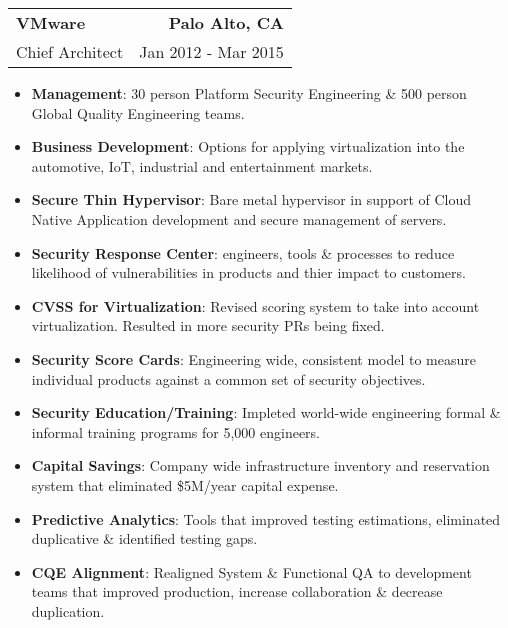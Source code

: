\documentclass[letterpaper,11pt]{article}
\makeatletter
\newcommand{\resumeSubheading}[4]{
  \vspace{-1pt}
    \item
    \begin{tabular*}{1.0\textwidth}[t]{l@{\extracolsep{\fill}}r}
      \textbf{\Large#1} & \textbf{#2} \\
      {\large #3} & {\large #4}
    \end{tabular*}\vspace{-5pt}
  }
\newcommand{\resumeItem}[2]{\item{{\textbf{\small#1}}: {\small#2 \vspace{-1pt}}}}
\newcommand{\resumeItemListStart}{\begin{itemize}}
\newcommand{\resumeItemListEnd}{\end{itemize}}\vspace{-10pt}
\makeatother
\begin{document}
        \resumeSubheading
            {VMware}
            {Palo Alto, CA}
            {Chief Architect}
            {Jan 2012 - Mar 2015}
            \resumeItemListStart
                \resumeItem{Management}{30 person Platform Security Engineering \& 500 person Global Quality Engineering teams.}
                \resumeItem{Business Development}{Options for applying virtualization into the automotive, IoT, industrial and entertainment markets.}
                \resumeItem{Secure Thin Hypervisor}{Bare metal hypervisor in support of Cloud Native Application development and secure management of servers.}
                \resumeItem{Security Response Center}{engineers, tools \& processes to reduce likelihood of vulnerabilities in products and thier impact to customers.}
                \resumeItem{CVSS for Virtualization}{Revised scoring system to take into account virtualization.  Resulted in more security PRs being fixed.}
                \resumeItem{Security Score Cards}{Engineering wide, consistent model to measure individual products against a common set of security objectives.}
                \resumeItem{Security Education/Training}{Impleted world-wide engineering formal \& informal training programs for 5,000 engineers.}
                \resumeItem{Capital Savings}{Company wide infrastructure inventory and reservation system that eliminated \$5M/year capital expense.}
                \resumeItem{Predictive Analytics}{Tools that improved testing estimations, eliminated duplicative \& identified testing gaps.}
                \resumeItem{CQE Alignment}{Realigned System \& Functional QA to development teams that improved production, increase collaboration \& decrease duplication.}
            \resumeItemListEnd
  
\end{document}
